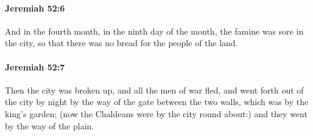 		\paragraph{Jeremiah 52:6} %
			\label{JEREMIAH-52-6}

			And in the fourth month, in the ninth day of the month, the famine was sore in the city, so that there was no bread for the people of the land.


		\paragraph{Jeremiah 52:7} %
			\label{JEREMIAH-52-7}

			Then the city was broken up, and all the men of war fled, and went forth out of the city by night by the way of the gate between the two walls, which was by the king’s garden; (now the Chaldeans were by the city round about:) and they went by the way of the plain.


